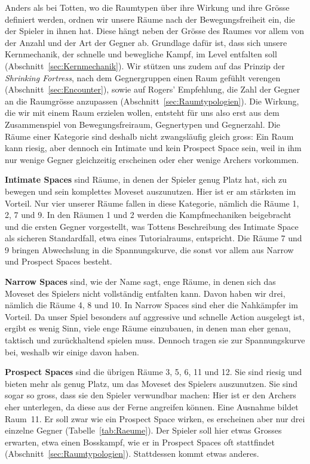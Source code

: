 \documentclass[../Main.tex]{subfiles}
\begin{document}
Anders als bei Totten, wo die Raumtypen über ihre Wirkung und ihre Grösse definiert werden, ordnen wir unsere Räume nach der Bewegungsfreiheit ein, die der Spieler in ihnen hat. Diese hängt neben der Grösse des Raumes vor allem von der Anzahl und der Art der Gegner ab. Grundlage dafür ist, dass sich unsere Kernmechanik, der schnelle und bewegliche Kampf, im Level entfalten soll (Abschnitt~\ref{sec:Kernmechanik}). Wir stützen uns zudem auf das Prinzip der \textit{Shrinking Fortress}, nach dem Gegnergruppen einen Raum gefühlt verengen (Abschnitt~\ref{sec:Encounter}), sowie auf Rogers' Empfehlung, die Zahl der Gegner an die Raumgrösse anzupassen (Abschnitt~\ref{sec:Raumtypologien}). Die Wirkung, die wir mit einem Raum erzielen wollen, entsteht für uns also erst aus dem Zusammenspiel von Bewegungsfreiraum, Gegnertypen und Gegnerzahl. Die Räume einer Kategorie sind deshalb nicht zwangsläufig gleich gross: Ein Raum kann riesig, aber dennoch ein Intimate und kein Prospect Space sein, weil in ihm nur wenige Gegner gleichzeitig erscheinen oder eher wenige Archers vorkommen.

\textbf{Intimate Spaces} sind Räume, in denen der Spieler genug Platz hat, sich zu bewegen und sein komplettes Moveset auszunutzen. Hier ist er am stärksten im Vorteil. Nur vier unserer Räume fallen in diese Kategorie, nämlich die Räume 1, 2, 7 und 9. In den Räumen 1 und 2 werden die Kampfmechaniken beigebracht und die ersten Gegner vorgestellt, was Tottens Beschreibung des Intimate Space als sicheren Standardfall, etwa eines Tutorialraums, entspricht. Die Räume 7 und 9 bringen Abwechslung in die Spannungskurve, die sonst vor allem aus Narrow und Prospect Spaces besteht.

\textbf{Narrow Spaces} sind, wie der Name sagt, enge Räume, in denen sich das Moveset des Spielers nicht vollständig entfalten kann. Davon haben wir drei, nämlich die Räume 4, 8 und 10. In Narrow Spaces sind eher die Nahkämpfer im Vorteil. Da unser Spiel besonders auf aggressive und schnelle Action ausgelegt ist, ergibt es wenig Sinn, viele enge Räume einzubauen, in denen man eher genau, taktisch und zurückhaltend spielen muss. Dennoch tragen sie zur Spannungskurve bei, weshalb wir einige davon haben.

\textbf{Prospect Spaces} sind die übrigen Räume 3, 5, 6, 11 und 12. Sie sind riesig und bieten mehr als genug Platz, um das Moveset des Spielers auszunutzen. Sie sind sogar so gross, dass sie den Spieler verwundbar machen: Hier ist er den Archers eher unterlegen, da diese aus der Ferne angreifen können. Eine Ausnahme bildet Raum~11. Er soll zwar wie ein Prospect Space wirken, es erscheinen aber nur drei einzelne Gegner (Tabelle~\ref{tab:Raeume}). Der Spieler soll hier etwas Grosses erwarten, etwa einen Bosskampf, wie er in Prospect Spaces oft stattfindet (Abschnitt~\ref{sec:Raumtypologien}). Stattdessen kommt etwas anderes.
\end{document}
